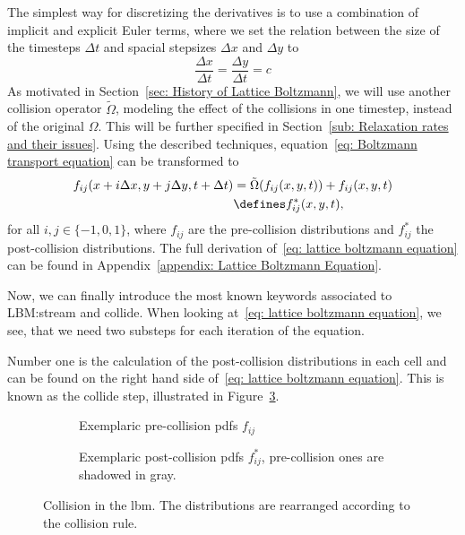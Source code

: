 The simplest way for discretizing the derivatives is to use a combination of implicit and explicit Euler terms, where we set the relation between the size of the timesteps $\Delta t$ and spacial stepsizes $\Delta x$ and $\Delta y$ to
\begin{equation}
  \label{eq: relation between stepsizes}
  \frac{\Delta x} {\Delta{t}} = \frac{\Delta y} {\Delta{t}} = c
\end{equation}
As motivated in Section~\ref{sec: History of Lattice Boltzmann}, we will use another collision operator $\tilde{\Omega}$, modeling the effect of the collisions in one timestep, instead of the original $\Omega$.
This will be further specified in Section~\ref{sub: Relaxation rates and their issues}.
Using the described techniques, equation~\eqref{eq: Boltzmann transport equation} can be transformed to
\begin{equation}
  \label{eq: lattice boltzmann equation}
  \begin{aligned}
    f_{ij}(x + i \Delta x , y + j \Delta y,t + \Delta t)
    &= \tilde{\Omega}(f_{ij}(x,y,t))
    + f_{ij}(x,y,t)
    \\&
    \defines f_{ij}^*(x, y, t),
  \end{aligned}
\end{equation}
for all $i,j\in \{-1, 0, 1\}$, where $f_{ij}$ are the pre-collision distributions and $f_{ij}^*$ the post-collision distributions.
The full derivation of~\eqref{eq: lattice boltzmann equation} can be found in Appendix~\ref{appendix: Lattice Boltzmann Equation}.

Now, we can finally introduce the most known keywords associated to LBM:\@ stream and collide.
When looking at~\eqref{eq: lattice boltzmann equation}, we see, that we need two substeps for each iteration of the equation.

Number one is the calculation of the post-collision distributions in each cell and can be found on the right hand side of~\eqref{eq: lattice boltzmann equation}. This is known as the collide step, illustrated in Figure~\ref{fig: examplary collision}.

\begin{figure}
\centering
\begin{subfigure}{.5\textwidth}
  \centering
  
\caption{Exemplaric pre-collision \glspl{pdf} $f_{ij}$\linebreak}
\label{fig: pre-collision example}
\end{subfigure}%
\begin{subfigure}{.5\textwidth}
  \centering
  
\caption{Exemplaric post-collision \glspl{pdf} $f_{ij}^*$, pre-collision ones are shadowed in gray.}
\label{fig: post-collision example}
\end{subfigure}
\caption{Collision in the \gls{lbm}. The distributions are rearranged according to the collision rule.}
\label{fig: examplary collision}
\end{figure}

